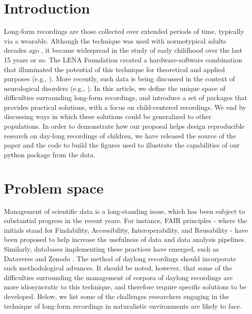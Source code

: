 \documentclass[smallextended]{svjour3}       %
\begin{document}
\section{Introduction}

Long-form recordings are those collected over extended periods of time, typically via a wearable. Although the technique was used with normotypical adults decades ago \citep{ear1,ear2}, it became widespread in the study of early childhood over the last 15 years or so. The LENA Foundation created a hardware-software combination that illuminated the potential of this technique for theoretical and applied purposes (e.g., \citealt{christakis2009audible,warlaumont2014social}). More recently, such data is being discussed in the context of neurological disorders (e.g., \citealt{riad2020vocal}). In this article, we define the unique space of difficulties surrounding long-form recordings, and introduce a set of packages that provides practical solutions, with a focus on child-centered recordings. We end by discussing ways in which these solutions could be generalized to other populations. In order to demonstrate how our proposal helps design reproducible research on day-long recordings of children, we have released the source of the paper and the code to build the figures used to illustrate the capabilities of our python package from the data.

\section{Problem space}\label{section:problemspace}

Management of scientific data is a long-standing issue, which has been subject to substantial progress in the recent years. For instance, FAIR principles \citep{Wilkinson2016} - where the initials stand for Findability, Accessibility, Interoperability, and Reusability - have been proposed to help increase the usefulness of data and data analysis pipelines. Similarly, databases implementing these practices have emerged, such as Dataverse \citep{dataverse} and Zenodo \citep{zenodo}. The method of daylong recordings should incorporate such methodological advances. It should be noted, however, that some of the difficulties surrounding the management of corpora of daylong recordings are more idiosyncratic to this technique, and therefore require specific solutions to be developed. Below, we list some of the challenges researchers engaging in the technique of long-form recordings in naturalistic environments are likely to face. 
\end{document}
